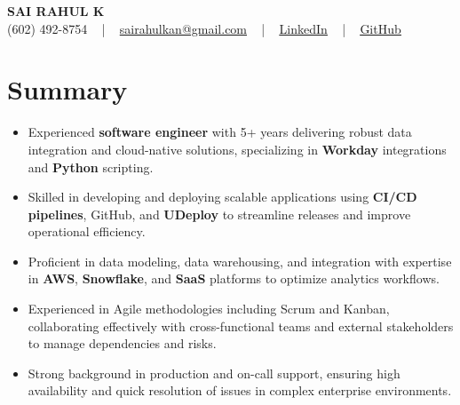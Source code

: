 \documentclass[letterpaper,11pt]{article}
\newcommand{\resumeItem}[1]{
  \item\footnotesize{
    {#1 \vspace{-2pt}}
  }
}
\newcommand{\resumeItemListStart}{\begin{itemize}[leftmargin=*]}
\newcommand{\resumeItemListEnd}{\end{itemize}\vspace{-5pt}}
\begin{document}
\begin{center}
    {\fontsize{14pt}{12pt}\selectfont \textbf{\MakeUppercase{Sai Rahul K}}}\\ \vspace{2pt}
    \fontsize{10pt}{12pt}\selectfont (602) 492-8754 ~ | ~ \href{mailto:sairahulkan@gmail.com}{sairahulkan@gmail.com} ~ | ~
    \href{https://www.linkedin.com/in/rq123/}{\color{blue}\underline{LinkedIn}} ~ | ~
    \href{https://github.com/kanrahuldo}{\color{blue}\underline{GitHub}}~
    \vspace{-8pt}
\end{center}

\section{Summary}
\fontsize{9pt}{10pt}\selectfont
\resumeItemListStart
    \resumeItem{Experienced \textbf{software engineer} with 5+ years delivering robust data integration and cloud-native solutions, specializing in \textbf{Workday} integrations and \textbf{Python} scripting.}
    \resumeItem{Skilled in developing and deploying scalable applications using \textbf{CI/CD pipelines}, GitHub, and \textbf{UDeploy} to streamline releases and improve operational efficiency.}
    \resumeItem{Proficient in data modeling, data warehousing, and integration with expertise in \textbf{AWS}, \textbf{Snowflake}, and \textbf{SaaS} platforms to optimize analytics workflows.}
    \resumeItem{Experienced in Agile methodologies including Scrum and Kanban, collaborating effectively with cross-functional teams and external stakeholders to manage dependencies and risks.}
    \resumeItem{Strong background in production and on-call support, ensuring high availability and quick resolution of issues in complex enterprise environments.}
\resumeItemListEnd
\vspace{-6pt}
\end{document}
